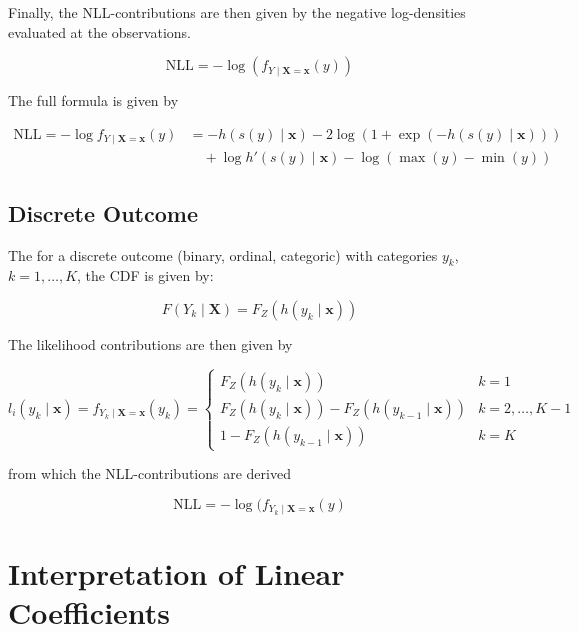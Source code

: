 Finally, the NLL-contributions are then given by the negative log-densities evaluated at the observations.

\begin{equation}
\text{NLL} = - \log (f_{Y \mid \mathbf{X} = \mathbf{x}}(y))
\end{equation}

The full formula is given by

\begin{align}
\text{NLL} = - \log f_{Y \mid \mathbf{X} = \mathbf{x}}(y)
&= -h(s(y) \mid \mathbf{x}) - 2 \log(1 + \exp(-h(s(y) \mid \mathbf{x}))) \nonumber \\
&\quad + \log h'(s(y) \mid \mathbf{x}) - \log(\max(y) - \min(y))
\end{align}




\subsection{Discrete Outcome}


The for a discrete outcome (binary, ordinal, categoric) with categories $y_k$, $k = 1, \ldots, K$, the CDF is given by:

\begin{equation}
F(Y_k \mid \mathbf{X}) = F_Z(h(y_k \mid \mathbf{x}))
\end{equation}

The likelihood contributions are then given by

\begin{equation}
l_i(y_k \mid \mathbf{x}) = f_{Y_k \mid \mathbf{X} = \mathbf{x}}(y_k) =
    \begin{cases}
      F_Z(h(y_k \mid \mathbf{x})) & k=1\\
      F_Z(h(y_k \mid \mathbf{x})) - F_Z(h(y_{k-1} \mid \mathbf{x})) & k=2,\ldots, K-1\\
      1- F_Z(h(y_{k-1} \mid \mathbf{x})) & k = K
    \end{cases}
\end{equation}


from which the NLL-contributions are derived

\begin{equation}
\text{NLL} = - \log (f_{Y_k \mid \mathbf{X} = \mathbf{x}}(y)
\end{equation}


\section{Interpretation of Linear Coefficients} \label{sec:interpretation_linear_coefficients}

